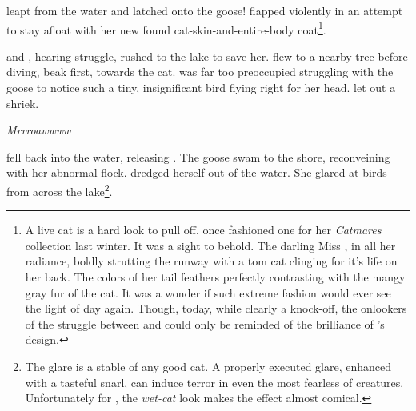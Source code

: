 \noindent
\pixel{} leapt from the water and latched onto the goose!
\goose{} flapped violently in an attempt to stay afloat with her new found
cat-skin-and-entire-body coat\footnote{
A live cat is a hard look to pull off.  \peacockF{} once fashioned
one for her \textit{Catmares} collection last winter.  It was a sight to behold.
The darling Miss \peacock, in all her radiance, boldly strutting the runway
with a tom cat clinging for it's life on her back.  The colors of her tail feathers
perfectly contrasting with the mangy gray fur of the cat.  It was a wonder if
such extreme fashion would ever see the light of day again.
Though, today, while clearly a knock-off, the onlookers of the struggle between
\goose{} and \pixel{} could only be reminded of the brilliance of \peacock's design.
}.
\VV


\noindent
\pidgenF{} and \doveF, hearing \goose{} struggle, rushed to the lake to save her.
\dove{} flew to a nearby tree before diving, beak first, towards the cat.
\pixel{} was far too preoccupied struggling with the goose to notice such a tiny,
insignificant bird flying right for her head.  \pixel{} let out a shriek.
\VV


\Large{}\textit{Mrrroawwww}\normalsize
\VV


\noindent
\pixel{} fell back into the water, releasing \goose.  The goose swam to the
shore, reconveining with her abnormal flock.
\pixel{} dredged herself out of the water.
She glared at birds from across the lake\footnote{
The glare is a stable of any good cat.  A properly executed
glare, enhanced with a tasteful snarl, can induce terror in even
the most fearless of creatures.  Unfortunately for \pixel, the
\textit{wet-cat} look makes the effect almost comical.
}.

